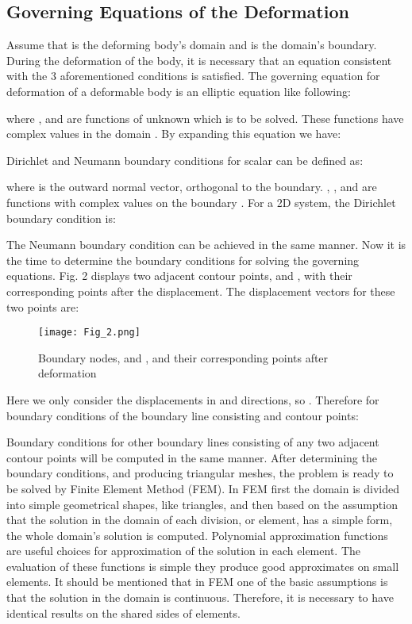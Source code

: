 \documentclass{jicspack}
\begin{document}
\subsection{Governing Equations of the Deformation}
Assume that  is the deforming body's domain and  is the domain's boundary. During the deformation of the body, it is necessary that an equation consistent with the 3 aforementioned conditions is satisfied. The governing equation for deformation of a deformable body is an elliptic equation like following: 

where ,  and  are functions of unknown  which is to be solved. These functions have complex values in the domain . By expanding this equation we have: 


Dirichlet and Neumann boundary conditions for scalar  can be defined as: 

where   is the outward normal vector, orthogonal to the boundary. , ,  and  are functions with complex values on the boundary . For a 2D system, the Dirichlet boundary condition is: 


The Neumann boundary condition can be achieved in the same manner. Now it is the time to determine the boundary conditions for solving the governing equations. Fig. 2 displays two adjacent contour points,  and , with their corresponding points after the displacement. The displacement vectors for these two points are: 


\begin{figure}
\centering
\texttt{[image: Fig\_2.png]}
\caption{Boundary nodes,  and , and their corresponding points after deformation}
\end{figure}

Here we only consider the displacements in  and  directions, so . Therefore for boundary conditions of the boundary line consisting  and  contour points: 


Boundary conditions for other boundary lines consisting of any two adjacent contour points
will be computed in the same manner. After determining the boundary conditions, and
producing triangular meshes, the problem is ready to be solved by Finite Element Method (FEM).
In FEM first the domain is divided into simple geometrical shapes, like triangles, and then
based on the assumption that the solution in the domain of each division, or element, has a
simple form, the whole domain's solution is computed. Polynomial approximation functions are useful choices for approximation of the solution in each element. The evaluation of these functions is simple they produce good approximates on small elements. It should be mentioned that in FEM one of the basic assumptions is that the solution in the domain is continuous. Therefore, it is necessary to have identical results on the shared sides of elements.
\end{document}
